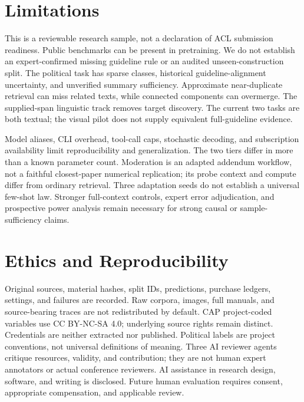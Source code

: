 \documentclass[11pt]{article}
\begin{document}
\section{Limitations}
This is a reviewable research sample, not a declaration of ACL submission readiness. Public benchmarks can be present in pretraining. We do not establish an expert-confirmed missing guideline rule or an audited unseen-construction split. The political task has sparse classes, historical guideline-alignment uncertainty, and unverified summary sufficiency. Approximate near-duplicate retrieval can miss related texts, while connected components can overmerge. The supplied-span linguistic track removes target discovery. The current two tasks are both textual; the visual pilot does not supply equivalent full-guideline evidence.

Model aliases, CLI overhead, tool-call caps, stochastic decoding, and subscription availability limit reproducibility and generalization. The two tiers differ in more than a known parameter count. Moderation is an adapted addendum workflow, not a faithful closest-paper numerical replication; its probe context and compute differ from ordinary retrieval. Three adaptation seeds do not establish a universal few-shot law. Stronger full-context controls, expert error adjudication, and prospective power analysis remain necessary for strong causal or sample-sufficiency claims.

\section*{Ethics and Reproducibility}
Original sources, material hashes, split IDs, predictions, purchase ledgers, settings, and failures are recorded. Raw corpora, images, full manuals, and source-bearing traces are not redistributed by default. CAP project-coded variables use CC BY-NC-SA 4.0; underlying source rights remain distinct. Credentials are neither extracted nor published. Political labels are project conventions, not universal definitions of meaning. Three AI reviewer agents critique resources, validity, and contribution; they are not human expert annotators or actual conference reviewers. AI assistance in research design, software, and writing is disclosed. Future human evaluation requires consent, appropriate compensation, and applicable review.

\end{document}
